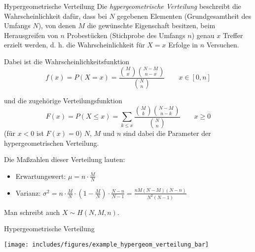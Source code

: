 \begin{defi}{Hypergeometrische Verteilung}
    Die \emph{hypergeometrische Verteilung} beschreibt die Wahrscheinlichkeit dafür, dass bei $N$ gegebenen Elementen (Grundgesamtheit des Umfangs $N$), von denen $M$ die gewünschte Eigenschaft besitzen, beim Herausgreifen von $n$ Probestücken (Stichprobe des Umfangs $n$) genau $x$ Treffer erzielt werden, d. h. die Wahrscheinlichkeit für $X = x$ Erfolge in $n$ Versuchen.

    Dabei ist die Wahrscheinlichkeitsfunktion
    \[
        f(x) = P(X = x) = \frac{\binom{M}{x} \binom{N-M}{n-x}}{\binom{N}{n}} \qquad x \in [0,n]
    \]

    und die zugehörige Verteilungsfunktion
    \[
        F(x) = P(X \leq x) = \sum_{k\leq x} \frac{\binom{M}{k} \binom{N-M}{n-k}}{\binom{N}{n}} \qquad x \geq 0
    \]
    (für $x < 0$ ist $F(x) = 0$) $N$, $M$ und $n$ sind dabei die Parameter der hypergeometrischen Verteilung.

    Die Maßzahlen dieser Verteilung lauten:
    \begin{itemize}
        \item Erwartungswert: $\mu = n \cdot \frac{M}{N}$
        \item Varianz: $\sigma^2 = n \cdot \frac{M}{N} \cdot \left( 1 - \frac{M}{N}\right) \cdot \frac{N-n}{N-1} = \frac{nM(N-M)(N-n)}{N^2(N-1)}$
    \end{itemize}

    Man schreibt auch $X \sim H(N,M,n)$.
\end{defi}

\begin{example}{Hypergeometrische Verteilung}
    \begin{center}
        \texttt{[image: includes/figures/example\_hypergeom\_verteilung\_bar]}
    \end{center}
\end{example}

